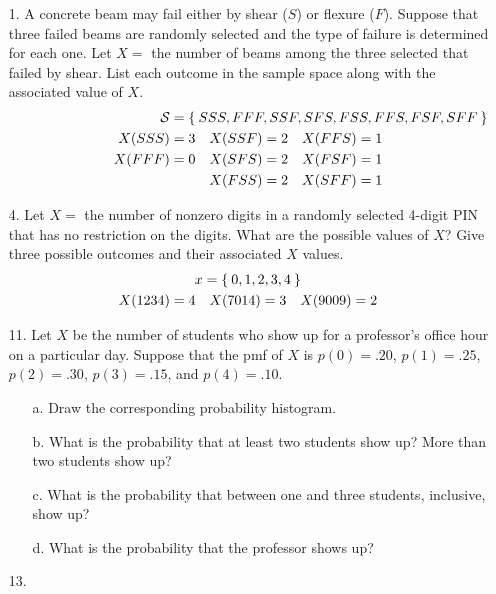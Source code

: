 \documentclass[letterpaper,12pt]{article}
\newcommand{\equationinalign}[2]{%
  \multispan{#2}%
  \hfill$\displaystyle{#1}$\hfill
  \ignorespaces
}
\begin{document}
\maketitle

\begin{enumerate}
  \item[1.]
    A concrete beam may fail either by shear ($S$) or flexure ($F$). Suppose that three failed beams are randomly selected and the type of failure is determined for each one. Let $X =$ the number of beams among the three selected that failed by shear. List each outcome in the sample space along with the associated value of $X$.
    \begin{align*}
      \mathcal{S} &= \mathrlap{\Set{SSS, FFF, SSF, SFS, FSS, FFS, FSF, SFF}} & & & & \\
      X(SSS) &= 3 & X(SSF) &= 2 & X(FFS) &= 1 \\
      X(FFF) &= 0 & X(SFS) &= 2 & X(FSF) &= 1 \\
                & & X(FSS) &= 2 & X(SFF) &= 1
    \end{align*}
  \item[4.]
    Let $X =$ the number of nonzero digits in a randomly selected 4-digit PIN that has no restriction on the digits. What are the possible values of $X$? Give three possible outcomes and their associated $X$ values.
    \begin{align*}
      \equationinalign{x = \Set{0, 1, 2, 3, 4}}{6} \\
      X(1234) &= 4 & X(7014) &= 3 & X(9009) &= 2
    \end{align*}
  \item[11.]
    Let $X$ be the number of students who show up for a professor’s office hour on a particular day. Suppose that the pmf of $X$ is $p(0) = .20$, $p(1) = .25$, $p(2) = .30$, $p(3) = .15$, and $p(4) = .10$.
    \begin{enumerate}
      \item[a.]
        Draw the corresponding probability histogram.
      \item[b.]
        What is the probability that at least two students show up? More than two students show up?
      \item[c.]
        What is the probability that between one and three students, inclusive, show up?
      \item[d.]
        What is the probability that the professor shows up?
    \end{enumerate}
  \item[13.]

\end{enumerate}
\end{document}
